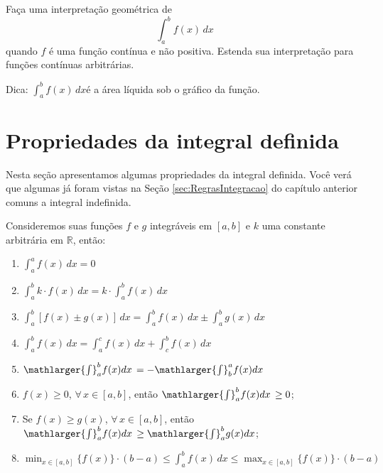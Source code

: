 \cleardoublepage\documentclass[../main.tex]{subfiles}
\begin{document}
\begin{exer}\label{exer:int_geointdef}
  Faça uma interpretação geométrica de
  \begin{equation*}
    \int_a^b f(x)\,dx
  \end{equation*}
  quando $f$ é uma função contínua e não positiva. Estenda sua interpretação para funções contínuas arbitrárias.
\end{exer}
\begin{resp}
  Dica: $\displaystyle \int_a^b f(x)\,dx$é a área líquida sob o gráfico da função.
\end{resp}



\section{Propriedades da integral definida}\hypertarget{PropIntDef}{}\label{sec:PropridIntDefinida}
Nesta seção apresentamos algumas propriedades da integral definida. Você verá que algumas já foram vistas na Seção \ref{sec:RegrasIntegracao} do capítulo anterior comuns a integral indefinida. 

Consideremos suas funções \(f\) e \(g\) integráveis em \([a,b]\) e \(k\) uma constante arbitrária em \(\mathbb{R}\), então:

\begin{enumerate}[1.]
\item $\displaystyle \int_a^a f(x)\,dx = 0$
\item $\displaystyle \int_a^b k\cdot f(x)\,dx = k\cdot\int_a^b f(x)\,dx$
\item $\displaystyle \int_a^b \left[f(x)\pm g(x)\right]\,dx = \int_a^b f(x)\,dx \pm \int_a^b g(x)\,dx$
\item $\displaystyle \int_a^b f(x)\,dx = \int_a^c f(x)\,dx + \int_c^b f(x)\,dx$
\item \( \mathlarger{\int}^{b}_{a}f(x)dx\, = - \mathlarger{\int}^{a}_{b}f(x)dx\)
\item  \(f(x)\geq 0\), \(\forall\,x\in[a,b]\), então \(\mathlarger{\int}^{b}_{a}f(x)dx\,\geq 0\);
\item Se \(f(x)\geq g(x)\), \(\forall\,x\in[a,b]\), então \(\mathlarger{\int}^{b}_{a}f(x)dx\,\geq \mathlarger{\int}^{b}_{a}g(x)dx\);
\item $\displaystyle \min_{x\in [a, b]} \{f(x)\}\cdot (b-a) \leq \int_a^b f(x)\,dx \leq \max_{x\in [a, b]} \{f(x)\}\cdot (b-a)$
\end{enumerate}
\end{document}
